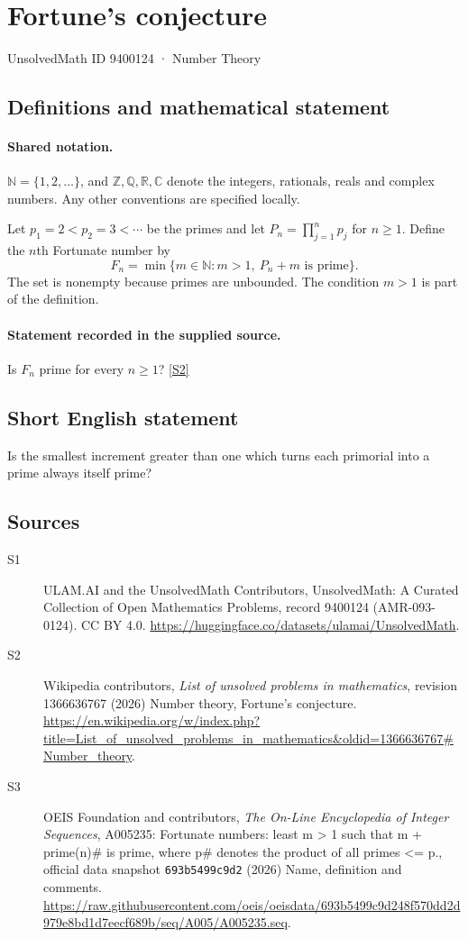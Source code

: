\documentclass[11pt]{article}
\newcommand{\sref}[2]{\hyperlink{source:#1:#2}{[S#2]}}
\begin{document}
\setcounter{section}{9400123}
\section{Fortune's conjecture}\label{9400124}
{\small\sffamily UnsolvedMath ID 9400124 · Number Theory}
\subsection{Definitions and mathematical statement}

\paragraph{Shared notation.}$\mathbb N=\{1,2,\ldots\}$, and $\mathbb Z,\mathbb Q,\mathbb R,\mathbb C$ denote the integers, rationals, reals and complex numbers. Any other conventions are specified locally.


Let $p_1=2<p_2=3<\cdots$ be the primes and let $P_n=\prod_{j=1}^{n}p_j$ for $n\ge1$. Define the $n$th Fortunate number by
\[
F_n=\min\{m\in\mathbb N:m>1,\ P_n+m\text{ is prime}\}.
\]
The set is nonempty because primes are unbounded. The condition $m>1$ is part of the definition.
\paragraph{Statement recorded in the supplied source.}
Is $F_n$ prime for every $n\ge1$? \sref{9400124}{2}
\subsection{Short English statement}
Is the smallest increment greater than one which turns each primorial into a prime always itself prime?
\subsection{Sources}
\begin{description}
\item[\hypertarget{source:9400124:1}{S1}] ULAM.AI and the UnsolvedMath Contributors, UnsolvedMath: A Curated Collection of Open Mathematics Problems, record 9400124 (AMR-093-0124). CC BY 4.0. \url{https://huggingface.co/datasets/ulamai/UnsolvedMath}.
\item[\hypertarget{source:9400124:2}{S2}] Wikipedia contributors, \emph{List of unsolved problems in mathematics}, revision 1366636767 (2026) Number theory, Fortune's conjecture. \url{https://en.wikipedia.org/w/index.php?title=List_of_unsolved_problems_in_mathematics&oldid=1366636767#Number_theory}.
\item[\hypertarget{source:9400124:3}{S3}] OEIS Foundation and contributors, \emph{The On-Line Encyclopedia of Integer Sequences}, A005235: Fortunate numbers: least m > 1 such that m + prime(n)\# is prime, where p\# denotes the product of all primes <= p., official data snapshot \texttt{693b5499c9d2} (2026) Name, definition and comments. \url{https://raw.githubusercontent.com/oeis/oeisdata/693b5499c9d248f570dd2d979e8bd1d7eecf689b/seq/A005/A005235.seq}.
\end{description}
\label{end:9400124}
\end{document}
